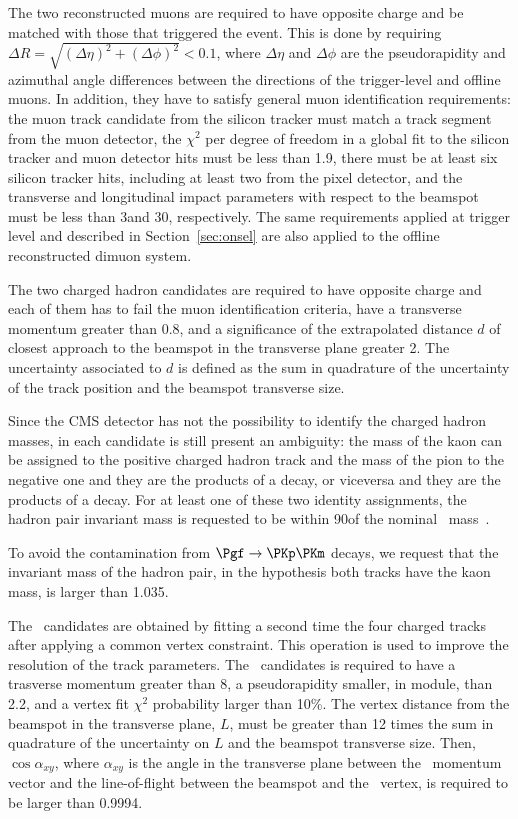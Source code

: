 The two reconstructed muons are required to have opposite charge and be matched with those that triggered the event. This is done by requiring $\Delta R = \sqrt{(\Delta\eta)^2+(\Delta\phi)^2}<0.1$, where $\Delta\eta$ and $\Delta\phi$ are the pseudorapidity and azimuthal angle differences between the directions of the trigger-level and offline muons.
In addition, they have to satisfy general muon identification requirements: the muon track candidate from the silicon  tracker must match a track segment from the muon detector, the $\chi^2$ per degree of freedom in a global fit to the silicon tracker and muon detector hits must be less than 1.9, there must be at least six silicon tracker hits, including at least two from the pixel detector, and the transverse and longitudinal impact parameters with respect to the beamspot must be less than 3\cm and 30\cm, respectively.
The same requirements applied at trigger level and described in Section~\ref{sec:onsel} are also applied to the offline reconstructed dimuon system.

The two charged hadron candidates are required to have opposite charge and each of them has to fail the muon identification criteria, have a transverse momentum greater than 0.8\GeV, and a significance of the extrapolated distance $d$ of closest approach to the beamspot in the transverse plane greater 2. The uncertainty associated to $d$ is defined as the sum in quadrature of the uncertainty of the track position and the beamspot transverse size.

Since the CMS detector has not the possibility to identify the charged hadron masses, in each candidate is still present an ambiguity: the mass of the kaon can be assigned to the positive charged hadron track and the mass of the pion to the negative one and they are the products of a \cPKstz decay, or viceversa and they are the products of a \cPAKstz decay.
For at least one of these two identity assignments, the hadron pair invariant mass is requested to be within 90\MeV of the nominal \cPKstz\ mass~\cite{PDG}.

To avoid the contamination from $\Pgf\to\PKp\PKm$ decays, we request that the invariant mass of the hadron pair, in the hypothesis both tracks have the kaon mass, is larger than 1.035\GeV.

The \PBz\ candidates are obtained by fitting a second time the four charged tracks after applying a common vertex constraint. This operation is used to improve the resolution of the track parameters.
The \PBz\ candidates is required to have a trasverse momentum greater than 8\GeV, a pseudorapidity smaller, in module, than 2.2, and a vertex fit $\chi^2$ probability larger than 10\%.
The vertex distance from the beamspot in the transverse plane, $L$, must be greater than 12 times the sum in quadrature of the uncertainty on $L$ and the beamspot transverse size. Then, $\cos{\alpha_{xy}}$, where $\alpha_{xy}$ is the angle in the transverse plane between the \PBz\ momentum vector and the line-of-flight between the beamspot and the \PBz\ vertex, is required to be larger than 0.9994.

